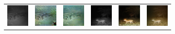 \begin{figure}[htp!]
\begin{subfigure}{\textwidth}
\begin{tabularx}{\textwidth}{Y Y Y !{\space} Y Y Y}
            \includegraphics{gfx/conditional-diffusion-sampling-caltech-qual/nir_585a6303-23d2-11e8-a6a3-ec086b02610b.jpg} & \includegraphics{gfx/conditional-diffusion-sampling-caltech-qual/cyclegan_585a6303-23d2-11e8-a6a3-ec086b02610b_fake.png} & \includegraphics{gfx/conditional-diffusion-sampling-caltech-qual/diffusion_585a6303-23d2-11e8-a6a3-ec086b02610b.png} & \includegraphics{gfx/conditional-diffusion-sampling-qual/nir_S2_B06_R1_PICT0128.jpg} & \includegraphics{gfx/conditional-diffusion-sampling-qual/cyclegan_S2_B06_R1_PICT0128_fake.png} & \includegraphics{gfx/conditional-diffusion-sampling-qual/diffusion_S2_B06_R1_PICT0128.png} \\

\end{tabularx}
\end{subfigure}
\end{figure}
